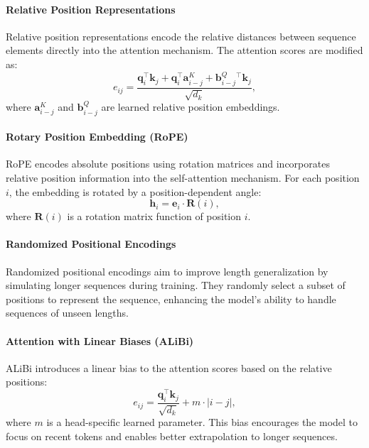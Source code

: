 \paragraph{Relative Position Representations}\label{subsec:relative_pos_rep}

Relative position representations \cite{shaw_self-attention_2018} encode the relative distances between sequence elements directly into the attention mechanism. The attention scores are modified as:
\begin{equation*}
    e_{ij} = \frac{\mathbf{q}_i^\top \mathbf{k}_j + \mathbf{q}_i^\top \mathbf{a}_{i-j}^K + \mathbf{b}_{i-j}^Q{}^\top \mathbf{k}_j}{\sqrt{d_k}},
\end{equation*}
where $\mathbf{a}_{i-j}^K$ and $\mathbf{b}_{i-j}^Q$ are learned relative position embeddings.

\paragraph{Rotary Position Embedding (RoPE)}\label{subsec:rope}

RoPE \cite{su_roformer_2024} encodes absolute positions using rotation matrices and incorporates relative position information into the self-attention mechanism. For each position $i$, the embedding is rotated by a position-dependent angle:
\begin{equation*}
    \mathbf{h}_i = \mathbf{e}_i \cdot \mathbf{R}(i),
\end{equation*}
where $\mathbf{R}(i)$ is a rotation matrix function of position $i$.

\paragraph{Randomized Positional Encodings}\label{subsec:random_pos_enc}

Randomized positional encodings \cite{ruoss_randomized_2023} aim to improve length generalization by simulating longer sequences during training. They randomly select a subset of positions to represent the sequence, enhancing the model's ability to handle sequences of unseen lengths.

\paragraph{Attention with Linear Biases (ALiBi)}\label{subsec:alibi}

ALiBi \cite{press_train_2021} introduces a linear bias to the attention scores based on the relative positions:
\begin{equation*}
    e_{ij} = \frac{\mathbf{q}_i^\top \mathbf{k}_j}{\sqrt{d_k}} + m \cdot |i - j|,
\end{equation*}
where $m$ is a head-specific learned parameter. This bias encourages the model to focus on recent tokens and enables better extrapolation to longer sequences.

